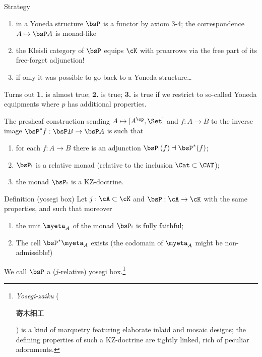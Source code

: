 \documentclass{beamer}
\begin{document}
\begin{frame}
	\begin{block}{Strategy}
		\begin{enumerate}
			\item in a Yoneda structure $\bsP$ is a functor by axiom 3-4; the correspondence $A\mapsto \bsP A$ is \alert{monad-like}
			\item<2-> \alert{the Kleisli category of $\bsP$ equips $\cK$ with proarrows via the free part of its free-forget adjunction!}
			\item<3-> if only it was possible to go back to a Yoneda structure\dots
		\end{enumerate}
	\end{block}
	\bigskip
	Turns out	\textbf{1.} is almost true; \textbf{2.} is true; \textbf{3.} is true if we restrict to so-called \alert{Yoneda equipments} where $p$ has additional properties.
\end{frame}
\begin{frame}
	The presheaf construction sending $A\mapsto [A^\op,\Set]$ and $f : A\to B$ to the inverse image $\bsP^*f : \bsP B\to \bsP A$ is such that
	\begin{enumerate}
		\item<2-> for each $f : A\to B$ there is an adjunction $\bsP_!(f) \dashv  \bsP^*(f)$;
		\item<3-> $\bsP_!$ is a \alert{relative monad} (relative to the inclusion $\Cat \subset \CAT$);
		\item<4-> the monad $\bsP_!$ is a \alert{KZ-doctrine}.
	\end{enumerate}
\end{frame}
\begin{frame}
	\begin{block}{Definition (yosegi box)}
		Let $j: \cA \subset \cK$ and $\bsP : \cA\to \cK$ with the same properties, and such that moreover
		\begin{enumerate}
			\item the unit $\myeta_A$ of the monad $\bsP_!$ is fully faithful;
			\item<2-> The cell $\bsP^*\myeta_A$ exists (the codomain of $\myeta_A$ might be non-admissible!)
		\end{enumerate}
		We call $\bsP$ a ($j$-relative) \alert{yosegi box.}\onslide<4->\footnote{\emph{Yosegi-zaiku} (\begin{CJK}{UTF8}{min}寄木細工\end{CJK}) is a kind of marquetry featuring elaborate inlaid and mosaic designs; the defining properties of such a KZ-doctrine are tightly linked, rich of peculiar adornments.}
	\end{block}

\end{frame}
\end{document}
